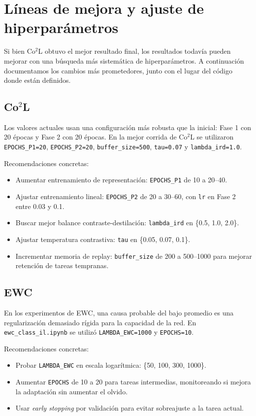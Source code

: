 \documentclass[10pt,a4paper]{article}
\begin{document}
\section{Líneas de mejora y ajuste de hiperparámetros}

Si bien Co$^2$L obtuvo el mejor resultado final, los resultados todavía pueden mejorar con una búsqueda más sistemática de hiperparámetros. A continuación documentamos los cambios más prometedores, junto con el lugar del código donde están definidos.

\subsection{Co$^2$L}
Los valores actuales usan una configuración más robusta que la inicial: Fase 1 con 20 épocas y Fase 2 con 20 épocas. En la mejor corrida de Co$^2$L se utilizaron \texttt{EPOCHS\_P1=20}, \texttt{EPOCHS\_P2=20}, \texttt{buffer\_size=500}, \texttt{tau=0.07} y \texttt{lambda\_ird=1.0}.

Recomendaciones concretas:
\begin{itemize}
	\item Aumentar entrenamiento de representación: \texttt{EPOCHS\_P1} de 10 a 20--40.
	\item Ajustar entrenamiento lineal: \texttt{EPOCHS\_P2} de 20 a 30--60, con \texttt{lr} en Fase 2 entre 0.03 y 0.1.
	\item Buscar mejor balance contraste-destilación: \texttt{lambda\_ird} en \{0.5, 1.0, 2.0\}.
	\item Ajustar temperatura contrastiva: \texttt{tau} en \{0.05, 0.07, 0.1\}.
	\item Incrementar memoria de replay: \texttt{buffer\_size} de 200 a 500--1000 para mejorar retención de tareas tempranas.
\end{itemize}

\subsection{EWC}
En los experimentos de EWC, una causa probable del bajo promedio es una regularización demasiado rígida para la capacidad de la red. En \texttt{ewc\_class\_il.ipynb} se utilizó \texttt{LAMBDA\_EWC=1000} y \texttt{EPOCHS=10}.

Recomendaciones concretas:
\begin{itemize}
	\item Probar \texttt{LAMBDA\_EWC} en escala logarítmica: \{50, 100, 300, 1000\}.
	\item Aumentar \texttt{EPOCHS} de 10 a 20 para tareas intermedias, monitoreando si mejora la adaptación sin aumentar el olvido.
	\item Usar \textit{early stopping} por validación para evitar sobreajuste a la tarea actual.
\end{itemize}
\end{document}

